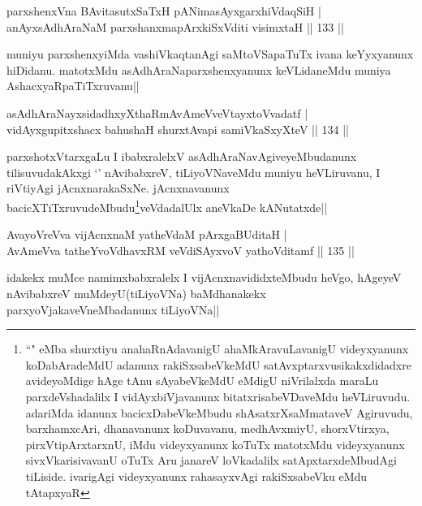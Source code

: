 
\begin{shl}
parxshenxVna BAvitasutxSaTxH pANimasAyxgarxhiVdaqSiH |\\
anAyxsAdhAraNaM parxshanxmapArxkiSxVditi visimxtaH \hfill || 133 ||
\end{shl}

\begin{artha}
muniyu parxshenxyiMda vashiVkaqtanAgi saMtoVSapaTuTx ivana keYyxyanunx hiDidanu. matotxMdu asAdhAraNaparxshenxyanunx keVLidaneMdu muniya AshacxyaRpaTiTxruvanu||
\end{artha}

\begin{shl}
asAdhAraNayxsidadhxyXthaRmAvAmeVveVtayxtoV\s vadatf |\\
vidAyxgupitxshacx bahushaH shurxtAvapi samiVkaSxyXteV \hfill || 134 ||
\end{shl}

\begin{artha}
parxshotxVtarxgaLu I ibabxralelxV asAdhAraNavAgiveyeMbudanunx tilisuvudakAkxgi `\stext' nAvibabxreV, tiLiyoVNaveMdu muniyu heVLiruvanu, I riVtiyAgi jAcnxnarakaSxNe. jAcnxnavanunx bacicXTiTxruvudeMbudu\footnote{``\stext" eMba shurxtiyu anahaRnAdavanigU ahaMkAravuLavanigU videyxyanunx koDabAradeMdU adanunx rakiSxsabeVkeMdU satAvxptarxvusikakxdidadxre avideyoMdige hAge tAnu sAyabeVkeMdU eMdigU niVrilalxda maraLu parxdeVshadalilx I vidAyxbiVjavanunx bitatxrisabeVDaveMdu heVLiruvudu. adariMda idanunx bacicxDabeVkeMbudu shAsatxrXsaMmataveV Agiruvudu, barxhamxcAri, dhanavanunx koDuvavanu, medhAvxmiyU, shorxVtirxya, pirxVtipArxtarxnU, iMdu videyxyanunx koTuTx matotxMdu videyxyanunx sivxVkarisivavanU oTuTx Aru janareV loVkadalilx satApxtarxdeMbudAgi tiLiside. ivarigAgi videyxyanunx rahasayxvAgi rakiSxsabeVku eMdu tAtapxyaR}veVdadalUlx aneVkaDe kANutatxde||
\end{artha}

\begin{shl}
AvayoVreVva vijAcnxnaM yatheVdaM pArxgaBUditaH |\\
AvAmeVva tatheYvoVdhavxRM veVdiSAyxvoV yathoVditamf \hfill || 135 ||
\end{shl}

\begin{artha}
idakekx muMce namimxbabxralelx I vijAcnxnavididxteMbudu heVgo, hAgeyeV nAvibabxreV muMdeyU(tiLiyoVNa) baMdhanakekx parxyoVjakaveVneMbadanunx tiLiyoVNa||
\end{artha}

